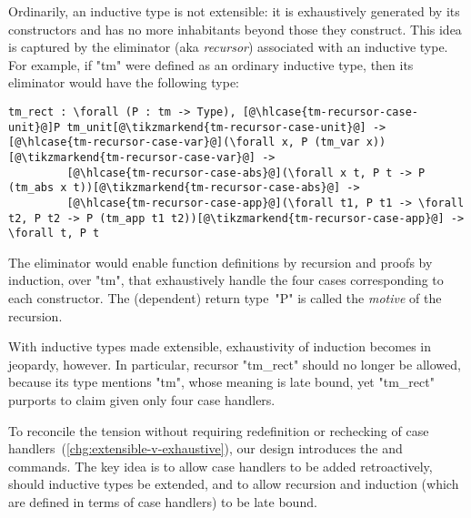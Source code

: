 
Ordinarily, an inductive type is not extensible: it is exhaustively
generated by its constructors and has no more inhabitants beyond those
they construct.
This idea is captured by the eliminator (aka \emph{recursor})
associated with an inductive type.
For example, if "tm" were defined as an ordinary inductive type, then
its eliminator would have the following type:

\begin{centered}
\begin{minipage}{.71\textwidth}
\newcommand\hlcase[1]{\tikzmarkin[disable rounded corners=true,set fill color=yellow!18,set border color=yellow!18]{#1}(0.00,-0.05)(-0.00,0.20)}
\begin{lstlisting}[basicstyle=\fontsize{8.25}{9}\ttfamily]
tm_rect : \forall (P : tm -> Type), [@\hlcase{tm-recursor-case-unit}@]P tm_unit[@\tikzmarkend{tm-recursor-case-unit}@] -> [@\hlcase{tm-recursor-case-var}@](\forall x, P (tm_var x))[@\tikzmarkend{tm-recursor-case-var}@] ->
         [@\hlcase{tm-recursor-case-abs}@](\forall x t, P t -> P (tm_abs x t))[@\tikzmarkend{tm-recursor-case-abs}@] ->
         [@\hlcase{tm-recursor-case-app}@](\forall t1, P t1 -> \forall t2, P t2 -> P (tm_app t1 t2))[@\tikzmarkend{tm-recursor-case-app}@] -> \forall t, P t
\end{lstlisting}
\end{minipage}
\end{centered}

\noindent
The eliminator would enable function definitions by recursion
and proofs by induction, over "tm", that exhaustively
handle the four cases corresponding to each constructor.
The (dependent) return type~"P" is called the \emph{motive} of the recursion.

With inductive types made extensible, exhaustivity of induction becomes
in jeopardy, however.
In particular, recursor "tm_rect" should no longer be allowed, because
its type mentions "tm", whose meaning is late bound, yet
"tm_rect" purports to claim  given only four case handlers.

To reconcile the tension without requiring redefinition or rechecking of
case handlers~(\ref{chg:extensible-v-exhaustive}),
our design introduces the  and  commands.
The key idea is to allow case handlers to be added retroactively, should
inductive types be extended, and to allow recursion and induction (which are defined in terms of case handlers) to be late bound.

